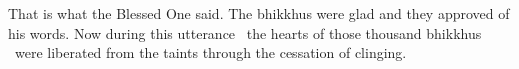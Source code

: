 \begin{english-only-hang}
  That is what the Blessed One said. The bhikkhus were glad and they approved of his words. Now during this utterance \breathmark\ the hearts of those thousand bhikkhus \breathmark\ were liberated from the taints through the cessation of clinging.
\end{english-only-hang}

\suttaRef{[SN 35.28]}


\endgroup

